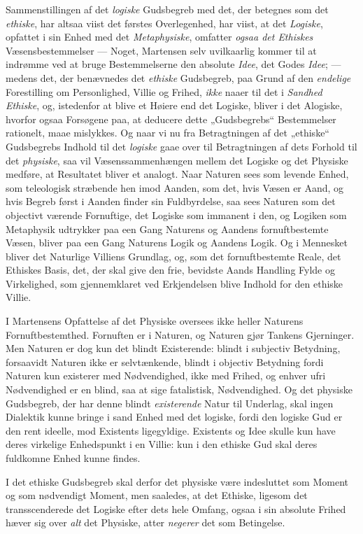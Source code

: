 \documentclass[12pt,a4paper]{book}
\newcommand{\opage}[1]{\marginnote{\footnotesize\textit{[#1]}}}
\begin{document}
Sammenstillingen af det \emph{logiske} Gudsbegreb med det, der betegnes som det \emph{ethiske}, har altsaa viist det førstes Overlegenhed, har viist, at det \emph{Logiske},
opfattet i sin Enhed med det \emph{Metaphysiske}, omfatter \emph{ogsaa det Ethiskes}
Væsensbestemmelser --- Noget, Martensen selv uvilkaarlig kommer til at indrømme ved
at bruge Bestemmelserne den absolute \emph{Idee}, det Godes \emph{Idee}; --- medens det, der
benævnedes det \emph{ethiske} Gudsbegreb, paa Grund af den \emph{endelige} Forestilling om
Personlighed, Villie og Frihed, \emph{ikke} naaer til det i \emph{Sandhed Ethiske}, og,
istedenfor at blive et Høiere end det Logiske, bliver i det Alogiske, hvorfor ogsaa
Forsøgene paa, at deducere dette „Gudsbegrebs“ Bestemmelser rationelt, maae
mislykkes. Og naar vi nu fra Betragtningen af det „ethiske“ Gudsbegrebs Indhold til det \emph{logiske} gaae over til Betragtningen af dets Forhold til det \emph{physiske}, saa vil
Væsenssammenhængen mellem det Logiske og det Physiske medføre, at Resultatet bliver
et analogt. Naar Naturen sees som levende Enhed, som teleologisk stræbende hen imod
Aanden, som det, hvis Væsen er Aand, og hvis Begreb først i Aanden finder sin
Fuldbyrdelse, saa sees Naturen som det objectivt værende Fornuftige, det Logiske
som immanent i den, og Logiken som Metaphysik udtrykker paa een Gang Naturens og
Aandens fornuftbestemte Væsen, bliver paa een Gang Naturens Logik og Aandens Logik.
Og i Mennesket bliver det Naturlige Villiens Grundlag, og, som det fornuftbestemte
Reale, det Ethiskes Basis, det, der skal give den frie, bevidste \opage{72}Aands Handling
Fylde og Virkelighed, som gjennemklaret ved Erkjendelsen blive Indhold for den
ethiske Villie.

I Martensens Opfattelse af det Physiske oversees ikke heller Naturens
Fornuftbestemthed. Fornuften er i Naturen, og Naturen gjør Tankens Gjerninger. Men
Naturen er dog kun det blindt Existerende: blindt i subjectiv Betydning, forsaavidt
Naturen ikke er selvtænkende, blindt i objectiv Betydning fordi Naturen kun
existerer med Nødvendighed, ikke med Frihed, og enhver ufri Nødvendighed er en
blind, saa at sige fatalistisk, Nødvendighed. Og det physiske Gudsbegreb, der har
denne blindt \emph{existerende} Natur til Underlag, skal ingen Dialektik kunne bringe i
sand Enhed med det logiske, fordi den logiske Gud er den rent ideelle, mod Existents
ligegyldige. Existents og Idee skulle kun have deres virkelige Enhedspunkt i en
Villie: kun i den ethiske Gud skal deres fuldkomne Enhed kunne findes.

I det ethiske Gudsbegreb skal derfor det physiske være indesluttet som Moment og
som nødvendigt Moment, men saaledes, at det Ethiske, ligesom det transscenderede
det Logiske efter dets hele Omfang, ogsaa i sin absolute Frihed hæver sig over \emph{alt} det Physiske, atter \emph{negerer} det som Betingelse.
\end{document}
